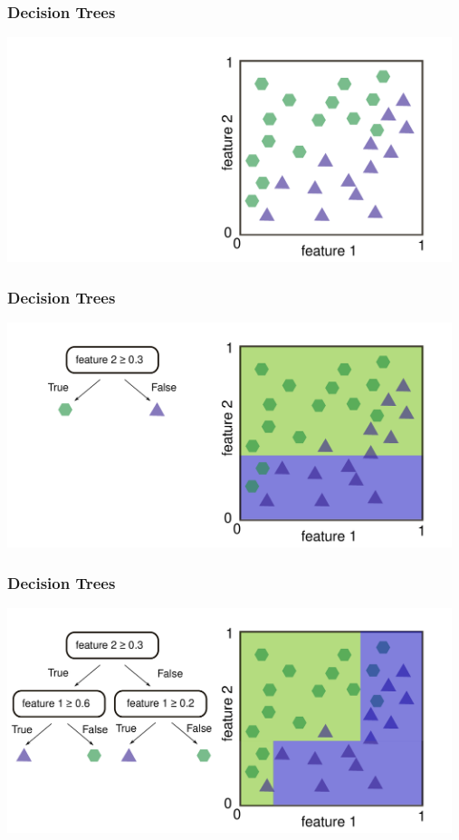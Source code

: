 \documentclass[aspectratio=169]{beamer}
\begin{document}
\begin{frame}
  \frametitle{Decision Trees}
  \begin{center}
    \includegraphics[width=13.0cm]{images/decision_tree_0.pdf}
  \end{center}  
\end{frame}

\begin{frame}
  \frametitle{Decision Trees}
  \begin{center}
    \includegraphics[width=13.0cm]{images/decision_tree_1.pdf}
  \end{center}  
\end{frame}

\begin{frame}
  \frametitle{Decision Trees}
  \begin{center}
    \includegraphics[width=13.0cm]{images/decision_tree_2.pdf}
  \end{center}  
\end{frame}
\end{document}
